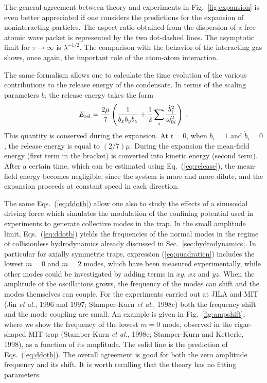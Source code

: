 The general agreement between theory and experiments
in Fig.~\ref{fig:expansion} is even better appreciated if one considers
the predictions for the expansion of noninteracting particles. The aspect
ratio obtained from the dispersion of a free atomic wave packet is 
represented by the two dot-dashed lines. The asymptotic limit for
$\tau \to \infty$ is $\lambda^{-1/2}$. The comparison with the behavior
of the interacting gas shows, once again, the important role of the 
atom-atom interaction.

The same formalism allows one to calculate the time evolution of the 
various contributions to the release energy of the condensate. In terms of 
the scaling  parameters $b_i$ the release energy takes the form  
\begin{equation}
E_{\rm rel} = {2 \mu \over 7} \left( { 1 \over b_x b_y b_z } 
+ {1\over 2} \sum_i { \dot{b}_i^2 \over \omega_{0i}^2 } 
\right) \; . 
\label{eq:release}
\end{equation}
This quantity is conserved during the expansion. At $t=0$, when $b_i=1$ 
and $\dot{b}_i=0$, the release energy is equal to $(2/7)\mu$. During the 
expansion the mean-field energy  (first term in the bracket) is converted 
into kinetic energy (second term).  After a certain time, which can 
be estimated using Eq.~(\ref{eq:release}), the mean-field energy becomes 
negligible, since the system is more and more dilute, and the 
expansion proceeds at constant speed in each direction. 

The same Eqs.~(\ref{eq:ddotb}) allow one also to study the effects of
a sinusoidal driving force which simulates  the modulation of the
confining potential used in experiments to generate collective modes in 
the trap. In the small amplitude limit, Eqs.~(\ref{eq:ddotb}) yields the 
frequencies of the normal modes in the regime of collisionless 
hydrodynamics already discussed in Sec.~\ref{sec:hydrodynamics}. 
In particular for axially
symmetric traps, expression (\ref{eq:quadraticn}) includes the
lowest $m=0$ and $m=2$ modes, which have been measured experimentally,
while other modes could be investigated by adding terms in $xy$, $xz$ and 
$yz$. When the amplitude of the oscillations grows, the frequency of
the modes can shift and the modes themselves can couple. For the
experiments carried out at  JILA and MIT (Jin {\it et al.}, 1996 and
1997; Stamper-Kurn {\it et al.},  1998c) both the frequency shift and
the mode coupling are small. An example is given in Fig.~\ref{fig:ampshift}, 
where we show the frequency of the lowest $m=0$ mode, observed in the 
cigar-shaped MIT trap (Stamper-Kurn {\it et al.}, 1998c; Stamper-Kurn 
and Ketterle, 1998), as a function of its amplitude. The
solid line is the prediction of Eqs.~(\ref{eq:ddotb}). The overall 
agreement is good for both the zero amplitude frequency and its
shift. It is worth recalling that the theory has no fitting
parameters.

